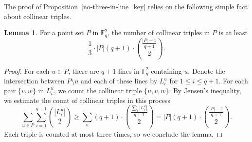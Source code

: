 \documentclass[11pt]{article}
\theoremstyle{definition}
\newtheorem{lemma}[theorem]{Lemma}
\begin{document}
The proof of Proposition~\ref{no-three-in-line_key} relies on the following simple fact about collinear triples.
\begin{lemma}\label{no-three-in-line_supersaturation}
    For a point set $P$ in $\mathbb{F}_q^2$, the number of collinear triples in $P$ is at least \begin{equation*}
        \frac{1}{3}\cdot|P|(q+1)\cdot\binom{\frac{|P|-1}{q+1}}{2}.
    \end{equation*}
\end{lemma}
\begin{proof}
    For each $u \in P$, there are $q+1$ lines in $\mathbb{F}_q^2$ containing $u$. Denote the intersection between $P\setminus u$ and each of these lines by $L^u_i$ for $1\leq i\leq q+1$. For each pair $\{v, w\}$ in $L^u_i$, we count the collinear triple $\{u,v,w\}$. By Jensen's inequality, we estimate the count of collinear triples in this process \begin{equation*}
        \sum_{u\in P}\sum_{i=1}^{q+1} \binom{|L^u_i|}{2} \geq \sum_u (q+1) \cdot \binom{\frac{\sum_i |L^u_i|}{q+1}}{2} = |P| (q+1)\cdot\binom{\frac{|P|-1}{q+1}}{2}.
    \end{equation*} Each triple is counted at most three times, so we conclude the lemma.
\end{proof}
\end{document}
